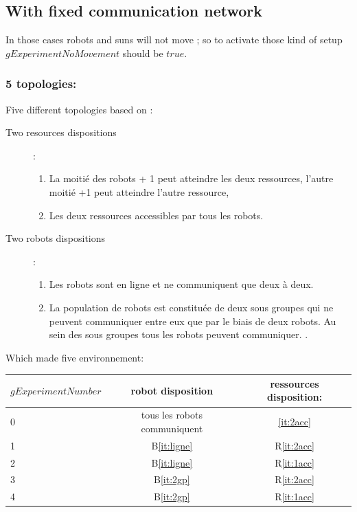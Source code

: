 \documentclass[a4paper,10pt]{report}
\begin{document}


\subsection{With fixed communication network} 
In those cases robots and suns will not move ; so to activate those kind of setup $gExperimentNoMovement$ should be $true$.

\subsubsection{5 topologies:}

Five different topologies based on :
\begin{description}
\item[ Two resources dispositions ]:
\begin{enumerate}[R1.]
\item La moitié des robots + 1 peut atteindre les deux ressources, l'autre moitié +1 peut atteindre l'autre ressource,  \label{it:1acc}
\item Les deux ressources accessibles par tous les robots.\label{it:2acc}
\end{enumerate}

\item[	Two robots dispositions]:
\begin{enumerate}[B1.]
\item Les robots sont en ligne et ne communiquent que deux à deux. \label{it:ligne}
\item La population de robots est constituée de deux sous groupes qui ne peuvent communiquer entre eux que par le biais de deux robots. Au sein des sous groupes tous les robots peuvent communiquer.
.\label{it:2gp}
\end{enumerate}
\end{description}

Which made five environnement:
\begin{table}[h]
\begin{tabular}{l|c|c|}
$gExperimentNumber$&robot disposition& ressources disposition: \\
\hline
0 &tous les robots communiquent & \ref{it:2acc}\\\hline
1 &B\ref{it:ligne} & R\ref{it:2acc}\\\hline
2 &B\ref{it:ligne} & R\ref{it:1acc} \\\hline
3&B\ref{it:2gp} & R\ref{it:2acc}\\\hline
4&B\ref{it:2gp} & R\ref{it:1acc} 
\end{tabular}
\end{table}
\end{document}
